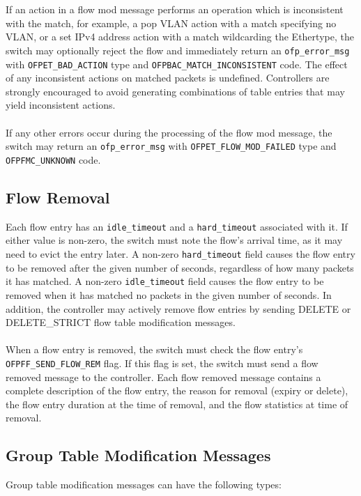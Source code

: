 \documentclass[10pt]{article}
\begin{document}
\\\\
If an action in a flow mod message performs an operation which is inconsistent with the match, for example, a pop VLAN action with a match specifying no VLAN, or a set IPv4 address action with a match wildcarding the Ethertype, the switch may optionally reject the flow and immediately return an \verb|ofp_error_msg| with \verb|OFPET_BAD_ACTION| type and \verb|OFPBAC_MATCH_INCONSISTENT| code.  The effect of any inconsistent actions on matched packets is undefined.  Controllers are strongly encouraged to avoid generating combinations of table entries that may yield inconsistent actions.
\\\\
If any other errors occur during the processing of the flow mod message, the switch may return an  \verb|ofp_error_msg| with \verb|OFPET_FLOW_MOD_FAILED| type and \verb|OFPFMC_UNKNOWN| code.
\subsection{Flow Removal}

Each flow entry has an \verb|idle_timeout| and a \verb|hard_timeout| associated with it.  If either value is non-zero, the switch must note the flow's arrival time, as it may need to evict the entry later.  A non-zero \verb|hard_timeout| field causes the flow entry to be removed after the given number of seconds, regardless of how many packets it has matched.  A non-zero \verb|idle_timeout| field causes the flow entry to be removed when it has matched no packets in the given number of seconds.  In addition, the controller may actively remove flow entries by sending DELETE or DELETE\_STRICT flow table modification messages.
\\\\
When a flow entry is removed, the switch must check the flow entry's \verb|OFPFF_SEND_FLOW_REM| flag.  If this flag is set, the switch must send a flow removed message to the controller.  Each flow removed message contains a complete description of the flow entry, the reason for removal (expiry or delete), the flow entry duration at the time of removal, and the flow statistics at time of removal.

\subsection{Group Table Modification Messages}
\label{group_table:sec_chan:group_mod}
\label{group_table:sec_chan:group_add}
\label{group_table:sec_chan:group_set}
\label{group_table:sec_chan:group_delete}
Group table modification messages can have the following types:

\end{document}
